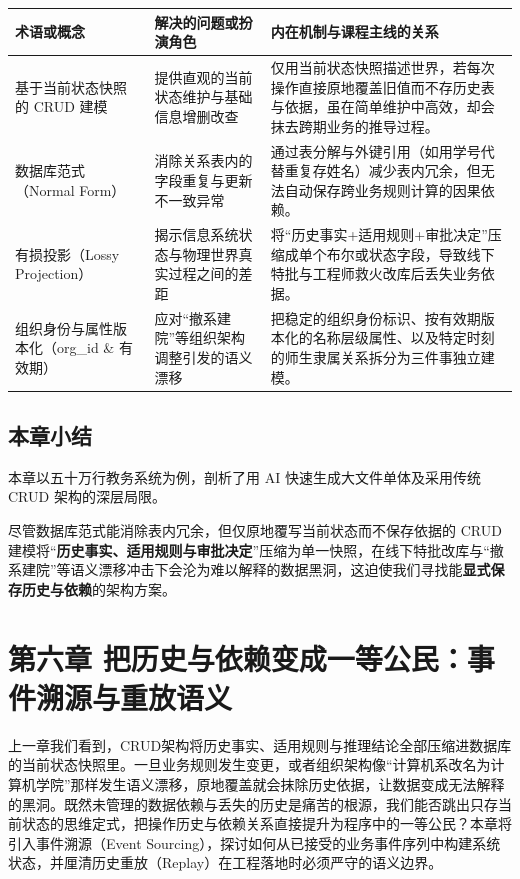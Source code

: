 \documentclass[UTF8,a4paper,11pt,fontset=fandol]{ctexart}
\begin{document}
\begin{center}\small\begin{tabularx}{\linewidth}{YYY}

\toprule

术语或概念 & 解决的问题或扮演角色 & 内在机制与课程主线的关系\\\midrule

基于当前状态快照的 CRUD 建模 & 提供直观的当前状态维护与基础信息增删改查 & 仅用当前状态快照描述世界，若每次操作直接原地覆盖旧值而不存历史表与依据，虽在简单维护中高效，却会抹去跨期业务的推导过程。\\[3pt]

数据库范式（Normal Form） & 消除关系表内的字段重复与更新不一致异常 & 通过表分解与外键引用（如用学号代替重复存姓名）减少表内冗余，但无法自动保存跨业务规则计算的因果依赖。\\[3pt]

有损投影（Lossy Projection） & 揭示信息系统状态与物理世界真实过程之间的差距 & 将“历史事实+适用规则+审批决定”压缩成单个布尔或状态字段，导致线下特批与工程师救火改库后丢失业务依据。\\[3pt]

组织身份与属性版本化（org\_id \& 有效期） & 应对“撤系建院”等组织架构调整引发的语义漂移 & 把稳定的组织身份标识、按有效期版本化的名称层级属性、以及特定时刻的师生隶属关系拆分为三件事独立建模。\\[3pt]

\bottomrule\end{tabularx}\end{center}

\subsection{本章小结}

本章以五十万行教务系统为例，剖析了用 AI 快速生成大文件单体及采用传统 CRUD 架构的深层局限。

尽管数据库范式能消除表内冗余，但仅原地覆写当前状态而不保存依据的 CRUD 建模将“\textbf{历史事实、适用规则与审批决定}”压缩为单一快照，在线下特批改库与“撤系建院”等语义漂移冲击下会沦为难以解释的数据黑洞，这迫使我们寻找能\textbf{显式保存历史与依赖}的架构方案。

\section{第六章 把历史与依赖变成一等公民：事件溯源与重放语义}

上一章我们看到，CRUD架构将历史事实、适用规则与推理结论全部压缩进数据库的当前状态快照里。一旦业务规则发生变更，或者组织架构像“计算机系改名为计算机学院”那样发生语义漂移，原地覆盖就会抹除历史依据，让数据变成无法解释的黑洞。既然未管理的数据依赖与丢失的历史是痛苦的根源，我们能否跳出只存当前状态的思维定式，把操作历史与依赖关系直接提升为程序中的一等公民？本章将引入事件溯源（Event Sourcing），探讨如何从已接受的业务事件序列中构建系统状态，并厘清历史重放（Replay）在工程落地时必须严守的语义边界。
\end{document}
